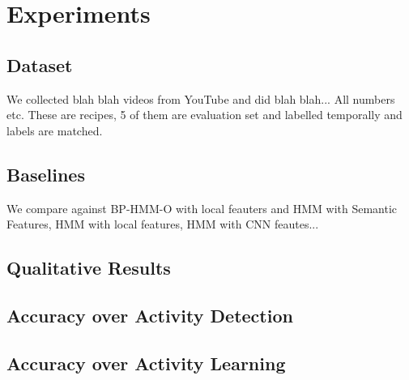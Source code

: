 \section{Experiments}
\subsection{Dataset}
We collected blah blah videos from YouTube and did blah blah... All numbers etc. These are recipes, 5 of them are evaluation set and labelled temporally and labels are matched.
\subsection{Baselines}
We compare against BP-HMM-O with local feauters and HMM with Semantic Features, HMM with local features, HMM with CNN feautes...
\subsection{Qualitative Results}
\subsection{Accuracy over Activity Detection}
\subsection{Accuracy over Activity Learning}
